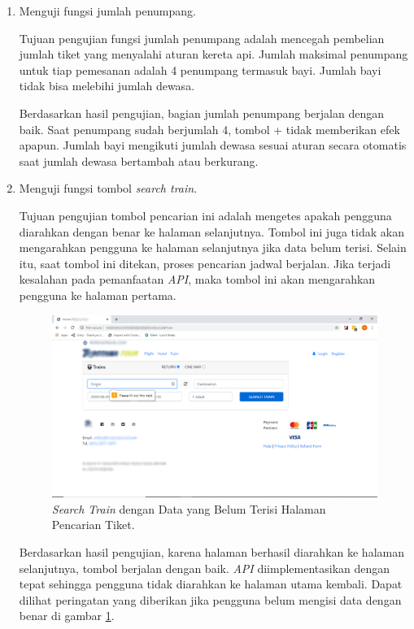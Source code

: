 \begin{enumerate}
        \item Menguji fungsi jumlah penumpang.
        
        Tujuan pengujian fungsi jumlah penumpang adalah mencegah pembelian jumlah tiket yang menyalahi aturan kereta api. Jumlah maksimal penumpang untuk tiap pemesanan adalah 4 penumpang termasuk bayi. Jumlah bayi tidak bisa melebihi jumlah dewasa.
        
        Berdasarkan hasil pengujian, bagian jumlah penumpang berjalan dengan baik. Saat penumpang sudah berjumlah 4, tombol + tidak memberikan efek apapun. Jumlah bayi mengikuti jumlah dewasa sesuai aturan secara otomatis saat jumlah dewasa bertambah atau berkurang.
        
        
        \item Menguji fungsi tombol \textit{search train}.
        
        Tujuan pengujian tombol pencarian ini adalah mengetes apakah pengguna diarahkan dengan benar ke halaman selanjutnya. Tombol ini juga tidak akan mengarahkan pengguna ke halaman selanjutnya jika data belum terisi. Selain itu, saat tombol ini ditekan, proses pencarian jadwal berjalan. Jika terjadi kesalahan pada pemanfaatan \textit{API}, maka tombol ini akan mengarahkan pengguna ke halaman pertama.
        
        \begin{figure}[H]
        \center
        \includegraphics[width=\textwidth,height=\textheight,keepaspectratio]{Gambar/Search train no data pencarian tiket.png}
        \caption{\textit{Search Train} dengan Data yang Belum Terisi Halaman Pencarian Tiket.}
            \label{img:searchnodatacari}
        \end{figure}
        
        Berdasarkan hasil pengujian, karena halaman berhasil diarahkan ke halaman selanjutnya, tombol berjalan dengan baik. \textit{API} diimplementasikan dengan tepat sehingga pengguna tidak diarahkan ke halaman utama kembali. Dapat dilihat peringatan yang diberikan jika pengguna belum mengisi data dengan benar di gambar \ref{img:searchnodatacari}.
        
    \end{enumerate}
    
